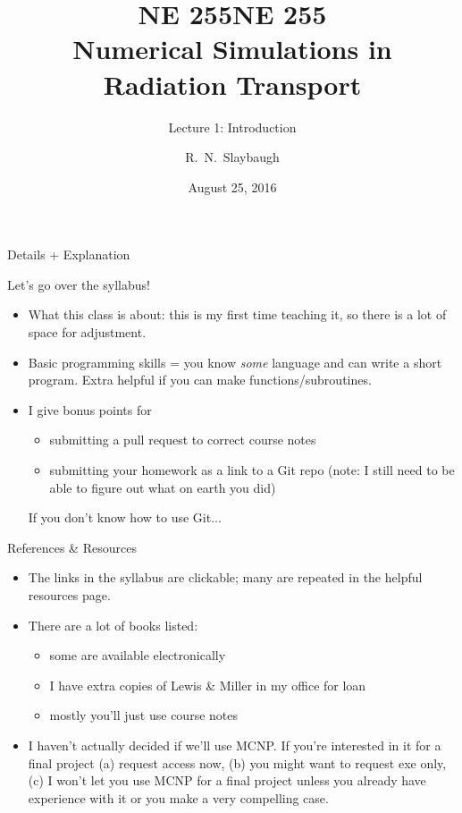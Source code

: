 \documentclass[xcolor=x11names,compress, handout]{beamer}
\title{NE 255}
\author{R.\ N.\ Slaybaugh}
\date{August 25, 2016}
\renewcommand{\(}{\begin{columns}}
\renewcommand{\)}{\end{columns}}
\newcommand{\<}[1]{\begin{column}{#1}}
\renewcommand{\>}{\end{column}}
\begin{document}
\begin{frame}
\title{NE 255\\Numerical Simulations in Radiation Transport}
\subtitle{Lecture 1: Introduction}
\titlepage
\end{frame}

\begin{frame}{Details + Explanation}

Let's go over the syllabus!

\begin{itemize}
\item What this class is about: this is my first time teaching it, so there is a lot of space for adjustment.

\item Basic programming skills = you know \textit{some} language and can write a short program. Extra helpful if you can make functions/subroutines.

\item I give bonus points for
  \begin{itemize}
  \item submitting a pull request to correct course notes
  \item submitting your homework as a link to a Git repo (note: I still need to be able to figure out what on earth you did)
  \end{itemize}
If you don't know how to use Git...
\end{itemize}

\end{frame}

\begin{frame}{References \& Resources}

\begin{itemize}
\item The links in the syllabus are clickable; many are repeated in the helpful resources page.

\item There are a lot of books listed: 
  \begin{itemize}
  \item some are available electronically
  \item I have extra copies of Lewis \& Miller in my office for loan
  \item mostly you'll just use course notes 
  \end{itemize}

\item I haven't actually decided if we'll use MCNP. If you're interested in it for a final project (a) request access now, (b) you might want to request exe only, (c) I won't let you use MCNP for a final project unless you already have experience with it or you make a very compelling case. 
\end{itemize}

\end{frame}
\end{document}
